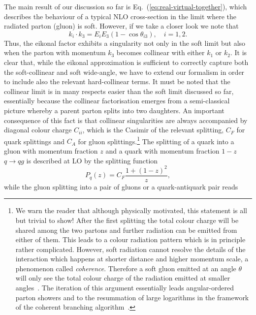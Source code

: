 The main result of our discussion so far is Eq.~(\ref{eq:real-virtual-together}), which describes the behaviour of a typical NLO cross-section in the limit where the radiated parton (gluon) is soft. However, if we take a closer look we note that 
\begin{equation}
k_i \cdot k_3 = E_i E_3 (1-\cos \theta_{i3}), \quad i=1,2.
\end{equation}
Thus, the eikonal factor exhibits a singularity not only in the soft limit but also when the parton with momentum $k_3$ becomes collinear with either $k_1$ or $k_2$.
It is clear that, while the eikonal approximation is sufficient to
correctly capture both the soft-collinear and soft wide-angle, we have to extend our formalism in order to include also the relevant hard-collinear terms. It must be noted that the collinear limit is in many respects easier than the soft limit discussed so far, essentially because the collinear factorisation emerges from a semi-classical picture whereby a parent parton splits into two daughters. An important consequence of this fact is that collinear singularities are always accompanied by diagonal colour charge $C_{ii}$, which is the Casimir of the relevant splitting, \ie  $C_F$ for quark splittings and $C_A$ for gluon splittings.\footnote{We warn the reader that although physically motivated, this statement is all but trivial to show!
 After the first splitting the total colour charge will be shared among the two partons and further radiation can be emitted from either of them.
 This leads to a colour radiation pattern which is in principle rather complicated.
 However, soft radiation cannot resolve the details of the interaction
 which happens at shorter distance and higher momentum scale, a
 phenomenon called \emph{coherence}. Therefore a soft gluon emitted at
 an angle $\theta$ will only see the total colour charge of the
 radiation emitted at smaller angles~\cite{Ermolaev:1981cm,Mueller:1981ex,Bassetto:1982ma}. 
 The iteration of this argument essentially leads angular-ordered
 parton showers and to the resummation of large logarithms in the
 framework of the coherent branching
 algorithm~\cite{Catani:1990rr,Catani:1992ua}.} 
 The splitting of a quark into a gluon with momentum fraction $z$ and
 a quark with momentum fraction $1-z$ $q \to q g$ is described at LO by the
 splitting function
 \begin{equation}\label{eq:quarksplitting}
 P_q(z)=C_F\frac{1+(1-z)^2}{z},
 \end{equation}
 while the gluon splitting into a pair of gluons or a quark-antiquark pair reads

